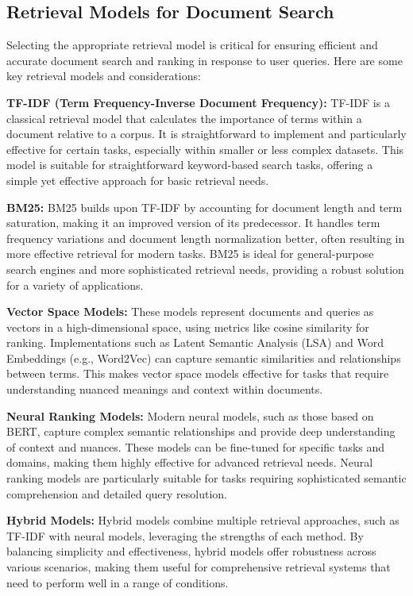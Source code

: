 \subsection{Retrieval Models for Document Search}

Selecting the appropriate retrieval model is critical for ensuring efficient and accurate document search and ranking in response to user queries. Here are some key retrieval models and considerations:

\textbf{TF-IDF (Term Frequency-Inverse Document Frequency):}
TF-IDF is a classical retrieval model that calculates the importance of terms within a document relative to a corpus. It is straightforward to implement and particularly effective for certain tasks, especially within smaller or less complex datasets. This model is suitable for straightforward keyword-based search tasks, offering a simple yet effective approach for basic retrieval needs.

\textbf{BM25:}
BM25 builds upon TF-IDF by accounting for document length and term saturation, making it an improved version of its predecessor. It handles term frequency variations and document length normalization better, often resulting in more effective retrieval for modern tasks. BM25 is ideal for general-purpose search engines and more sophisticated retrieval needs, providing a robust solution for a variety of applications.

\textbf{Vector Space Models:}
These models represent documents and queries as vectors in a high-dimensional space, using metrics like cosine similarity for ranking. Implementations such as Latent Semantic Analysis (LSA) and Word Embeddings (e.g., Word2Vec) can capture semantic similarities and relationships between terms. This makes vector space models effective for tasks that require understanding nuanced meanings and context within documents.

\textbf{Neural Ranking Models:}
Modern neural models, such as those based on BERT, capture complex semantic relationships and provide deep understanding of context and nuances. These models can be fine-tuned for specific tasks and domains, making them highly effective for advanced retrieval needs. Neural ranking models are particularly suitable for tasks requiring sophisticated semantic comprehension and detailed query resolution.

\textbf{Hybrid Models:}
Hybrid models combine multiple retrieval approaches, such as TF-IDF with neural models, leveraging the strengths of each method. By balancing simplicity and effectiveness, hybrid models offer robustness across various scenarios, making them useful for comprehensive retrieval systems that need to perform well in a range of conditions.

